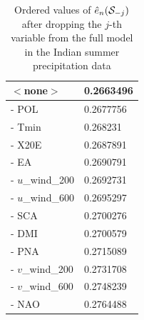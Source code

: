 \begin{table}
\begin{scriptsize}
\begin{tabular}{l|l}
    $<$none$>$                  & 0.2663496 \\ \hline
    - POL                   & 0.2677756 \\
    - Tmin                  & 0.268231  \\
    - X20E                  & 0.2687891 \\
    - EA                    & 0.2690791 \\
    - $u$\_wind\_200          & 0.2692731 \\
    - $u$\_wind\_600          & 0.2695297 \\
    - SCA                   & 0.2700276 \\
    - DMI                   & 0.2700579 \\
    - PNA                   & 0.2715089 \\
    - $v$\_wind\_200          & 0.2731708 \\
    - $v$\_wind\_600          & 0.2748239 \\
    - NAO                   & 0.2764488 \\ \hline
    \end{tabular}
\end{scriptsize}
\caption{Ordered values of  $\hat e_n ({\cal{S}}_{-j})$ after dropping the $j$-th variable from the full model in the Indian summer precipitation data}
\label{table:raintable}
\end{table}

